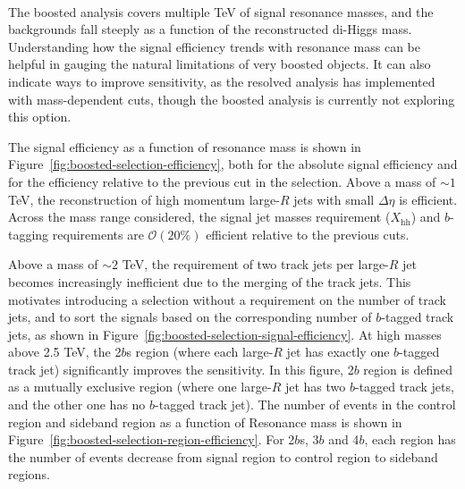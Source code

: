 \paragraph{}
The boosted analysis covers multiple TeV of signal resonance masses, and the backgrounds fall steeply as a function of the reconstructed di-Higgs mass. Understanding how the signal efficiency trends with resonance mass can be helpful in gauging the natural limitations of very boosted objects. It can also indicate ways to improve sensitivity, as the resolved analysis has implemented with mass-dependent cuts, though the boosted analysis is currently not exploring this option.

The signal efficiency as a function of resonance mass is shown in Figure~\ref{fig:boosted-selection-efficiency}, both for the absolute signal efficiency and for the efficiency relative to the previous cut in the selection. Above a mass of $\sim\!1$ TeV, the reconstruction of high momentum large-$R$ jets with small $\Delta\eta$ is efficient. Across the mass range considered, the signal jet masses requirement ($X_\text{hh}$) and $b$-tagging requirements are $\mathcal{O}(20\%)$ efficient relative to the previous cuts. 

Above a mass of $\sim\!2$ TeV, the requirement of two track jets per large-$R$ jet becomes increasingly inefficient due to the merging of the track jets. This motivates introducing a selection without a requirement on the number of track jets, and to sort the signals based on the corresponding number of $b$-tagged track jets, as shown in Figure~\ref{fig:boosted-selection-signal-efficiency}. At high masses above 2.5 TeV, the 2$b$s region (where each large-$R$ jet has exactly one $b$-tagged track jet) significantly improves the sensitivity. In this figure, 2$b$ region is defined as a mutually exclusive region (where one large-$R$ jet has two $b$-tagged track jets, and the other one has no $b$-tagged track jet). The number of events in the control region and sideband region as a function of Resonance mass is shown in Figure~\ref{fig:boosted-selection-region-efficiency}. For 2$b$s, 3$b$ and 4$b$, each region has the number of events decrease from signal region to control region to sideband regions.

